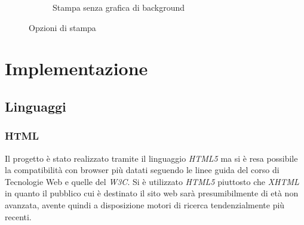 \documentclass[]{article}
\begin{document}
\begin{figure}[H]
\begin{subfigure}[t]{0.8\textwidth}
	  \caption{Stampa senza grafica di background}
	\end{subfigure}
	\caption{Opzioni di stampa}
\end{figure}

\section{Implementazione}
\subsection{Linguaggi}		
\subsubsection{HTML}	%
Il progetto è stato realizzato tramite il linguaggio \textit{HTML5} ma si è resa possibile la compatibilità con browser più datati seguendo le linee guida del corso di Tecnologie Web e quelle del \textit{W3C}.
Si è utilizzato \textit{HTML5} piuttosto che \textit{XHTML} in quanto il pubblico cui è destinato il sito web sarà presumibilmente di età non avanzata, avente quindi a disposizione motori di ricerca tendenzialmente più recenti.
\end{document}
